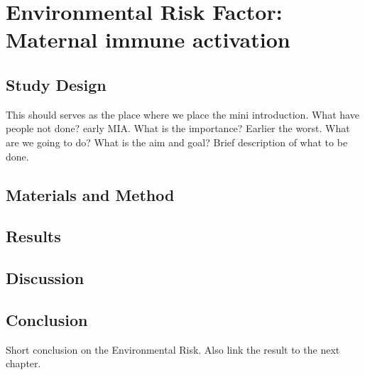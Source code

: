 \chapter[Environmental Risk Factor - Maternal immune activation]{Environmental Risk Factor:\\ Maternal immune activation}
\section{Study Design}
This should serves as the place where we place the mini introduction.
What have people not done? early MIA.
What is the importance? Earlier the worst.
What are we going to do?
What is the aim and goal?
Brief description of what to be done.
\section{Materials and Method}
%
\section{Results}
%
\section{Discussion}
%
\section{Conclusion}
Short conclusion on the Environmental Risk.
Also link the result to the next chapter.